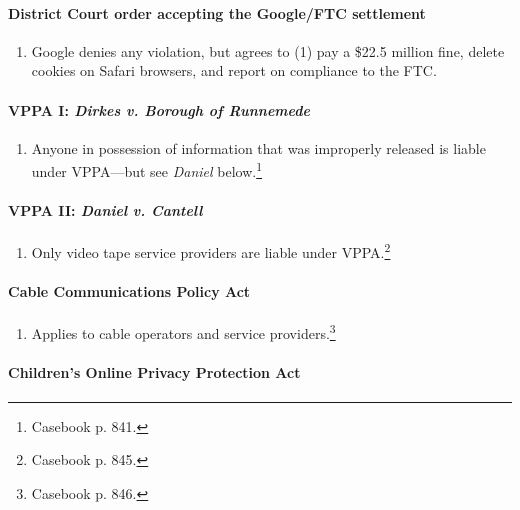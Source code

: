 \paragraph{District Court order accepting the Google/FTC settlement}

\begin{enumerate}
    \item Google denies any violation, but agrees to (1) pay a \$22.5 million 
    fine, delete cookies on Safari browsers, and report on compliance to the 
    FTC.
\end{enumerate}

\paragraph{VPPA I: \emph{Dirkes v. Borough of Runnemede}}

\begin{enumerate}
    \item Anyone in possession of information that was improperly released is 
    liable under VPPA---but see \emph{Daniel} below.\footnote{Casebook p. 841.}
\end{enumerate}

\paragraph{VPPA II: \emph{Daniel v. Cantell}}

\begin{enumerate}
    \item Only video tape service providers are liable under 
    VPPA.\footnote{Casebook p. 845.}
\end{enumerate}

\paragraph{Cable Communications Policy Act}

\begin{enumerate}
    \item Applies to cable operators and service providers.\footnote{Casebook p. 
    846.}
\end{enumerate}

\paragraph{Children's Online Privacy Protection Act}

